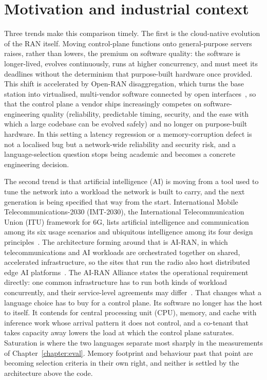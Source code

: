 \documentclass[english,oneside,a4paper,censored,csm,software-track-2020]{HYthesisML}
\begin{document}
\section{Motivation and industrial context}\label{sec:motivation}
Three trends make this comparison timely. The first is the cloud-native evolution of the RAN
itself. Moving control-plane functions onto general-purpose servers raises, rather than
lowers, the premium on software quality: the software is longer-lived, evolves continuously,
runs at higher concurrency, and must meet its deadlines without the determinism that
purpose-built hardware once provided. This shift is accelerated by Open-RAN disaggregation,
which turns the base station into virtualised, multi-vendor software connected by open
interfaces~\cite{polese2023oran}, so that the control plane a vendor ships increasingly
competes on software-engineering quality (reliability, predictable timing, security, and the
ease with which a large codebase can be evolved safely) and no longer on purpose-built hardware. In
this setting a latency regression or a memory-corruption defect is not a localised bug but a
network-wide reliability and security risk, and a language-selection question stops being
academic and becomes a concrete engineering decision.

The second trend is that artificial intelligence (AI) is moving from a tool used to tune the
network into a workload the network is built to carry, and the next generation is being
specified that way from the start. International Mobile Telecommunications-2030 (IMT-2030),
the International Telecommunication Union (ITU) framework for 6G, lists artificial
intelligence and communication among its
six usage scenarios and ubiquitous intelligence among its four design
principles~\cite{itu2023imt2030}. The architecture forming around that is AI-RAN, in which
telecommunications and AI workloads are orchestrated together on shared, accelerated
infrastructure, so the sites that run the radio also host distributed edge AI
platforms~\cite{polese2026airan}. The AI-RAN Alliance states the operational requirement
directly: one common infrastructure has to run both kinds of workload concurrently, and their
service-level agreements may differ~\cite{airan2026orchestrator}. That changes what a language
choice has to buy for a control plane. Its software no longer has the host to itself. It
contends for central processing unit (CPU), memory, and cache with inference work whose
arrival pattern it does not
control, and a co-tenant that takes capacity away lowers the load at which the control plane
saturates. Saturation is where the two languages separate most sharply in the measurements of
Chapter~\ref{chapter:eval}. Memory footprint and behaviour past that point are becoming
selection criteria in their own right, and neither is settled by the architecture above the
code.
\end{document}
